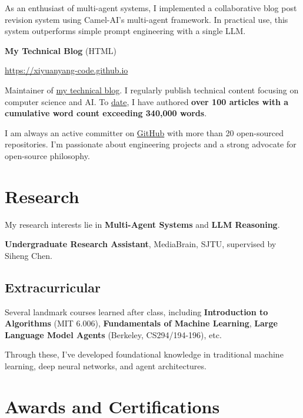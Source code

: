 \documentclass[letterpaper,11pt]{article}
\begin{document}
As an enthusiast of multi-agent systems, I implemented a collaborative blog post revision system using Camel-AI's multi-agent framework. In practical use, this system outperforms simple prompt engineering with a single LLM.
\newline

\textbf{My Technical Blog} (HTML)

\url{https://xiyuanyang-code.github.io} 

Maintainer of \href{https://xiyuanyang-code.github.io}{my technical blog}. I regularly publish technical content focusing on computer science and AI. To \href{https://xiyuanyang-code.github.io/Blog-word-counting/}{date}, I have authored \textbf{over 100 articles with a cumulative word count exceeding 340,000 words}.
\newline

I am always an active committer on \href{https://github.com/xiyuanyang-code}{GitHub} with more than 20 open-sourced repositories. I'm passionate about engineering projects and a strong advocate for open-source philosophy.

\section{Research}

My research interests lie in \textbf{Multi-Agent Systems} and \textbf{LLM Reasoning}. 

\textbf{Undergraduate Research Assistant}, MediaBrain, SJTU, supervised by Siheng Chen.

\subsection{Extracurricular}

Several landmark courses learned after class, including \textbf{Introduction to Algorithms} (MIT 6.006), \textbf{Fundamentals of Machine Learning}, \textbf{Large Language Model Agents} (Berkeley, CS294/194-196), etc. 

Through these, I've developed foundational knowledge in traditional machine learning, deep neural networks, and agent architectures.



\section{Awards and Certifications}
\end{document}
